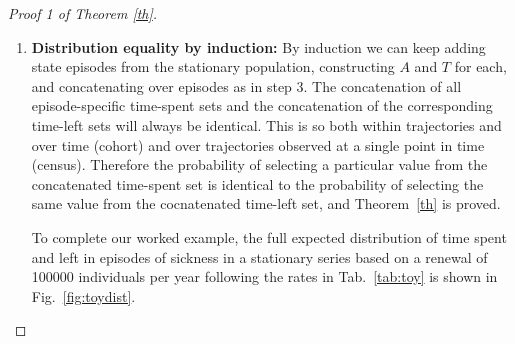\documentclass[12pt,oneside,a4paper]{article}
\theoremstyle{definition}
\newcommand{\vb}[1]{\texttt{#1}}
\begin{document}
\begin{proof}[Proof 1 of Theorem \ref{th}]
\begin{enumerate}
\begin{equation}
\label{eq:unioneq}
\{A^{i,j} , A^{i`,j`}\} = \{T^{i,j} , T^{i`,j`}\}
\end{equation}

The concatenation identity also applies if we replicate the life trajectory $d^{i`,j`}$ in $\delta$ time steps as in step 2. It is also true if we weight the sets derived from each trajectory by the probability of observing each trajectory.

\begin{tcolorbox}
For example, the  trajectory from Tab.~\ref{tab:traj}, \vb{SSSH}, has a single episode of sickness of duration three, yielding identical sets with four observations $A^{22,1} = \{0,1,2,3 \}$ and $T^{22,1} = \{3,2,1,0 \}$. If the trajectory is replicated as in step 2, the observations of $d^{22,1}$ will come from four cohorts born in years $t-5$ through $t-1$ and captured at ages 3, 2, 1, and 0, respectively. Whether observed over time as in step 1 or over individuals within time, as in step 2, the concatenation of $A^{21,1}$ and $A^{22,1}$ is equal to the concatenation of $T^{21,1}$ and $T^{22,1}$, $\{0,0,1,1,2,2,3 \}$. If each birth cohort derived from the probabilities in Tab.~\ref{tab:toy} starts with 100000 individuals, once in stationarity we would expect a hypothetical census to yield 540$\times$4 instances of trajectory 21 and 60$\times$5 of 22, so we would expect 600 observations of values 0, 1, and 2, and 60 observations of 3 from these two unique paths. 
\end{tcolorbox}

\item{\textbf{Distribution equality by induction:}} By induction we can keep adding state episodes from the stationary population, constructing $A$ and $T$ for each, and concatenating over episodes as in step 3. The concatenation of all episode-specific time-spent sets and the concatenation 
of the corresponding time-left sets will always be identical. This is so both within trajectories and over time (cohort) and over trajectories observed at a single point in time (census). Therefore the probability of selecting a particular value from the concatenated time-spent set is identical
to the probability of selecting the same value from the cocnatenated time-left set, and Theorem~\ref{th} is proved.

\begin{tcolorbox}
To complete our worked example, the full expected distribution of time spent and left in episodes of sickness in a stationary series based on a renewal of 100000 individuals per year following the rates in Tab.~\ref{tab:toy} is shown in Fig.~\ref{fig:toydist}.
\end{tcolorbox}


\end{enumerate}
\end{proof}
\end{document}
